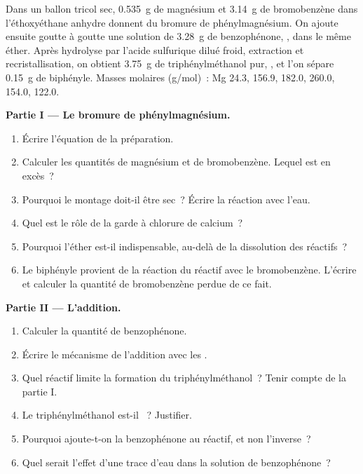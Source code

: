 \begin{problem}
\label{pb:b1:organomagnesium:1}
Dans un ballon tricol sec, \qty{0.535}{g} de magnésium et
\qty{3.14}{g} de bromobenzène dans l'éthoxyéthane anhydre donnent du
bromure de phénylmagnésium. On ajoute ensuite goutte à goutte une
solution de \qty{3.28}{g} de benzophénone,
, dans le même éther. Après hydrolyse par l'acide
sulfurique dilué froid, extraction et recristallisation, on obtient
\qty{3.75}{g} de triphénylméthanol pur, , et l'on sépare
\qty{0.15}{g} de biphényle. Masses molaires (\unit{g/mol})~:
Mg 24.3,  156.9,  182.0,  260.0,
 154.0,  122.0.

\medskip
\noindent\textbf{Partie I --- Le bromure de phénylmagnésium.}
\begin{enumerate}
  \item Écrire l'équation de la préparation.
  \item Calculer les quantités de magnésium et de bromobenzène. Lequel
        est en excès~?
  \item Pourquoi le montage doit-il être sec~? Écrire la réaction avec
        l'eau.
  \item Quel est le rôle de la garde à chlorure de calcium~?
  \item Pourquoi l'éther est-il indispensable, au-delà de la
        dissolution des réactifs~?
  \item Le biphényle provient de la réaction du réactif avec le
        bromobenzène. L'écrire et calculer la quantité de bromobenzène
        perdue de ce fait.
\end{enumerate}

\medskip
\noindent\textbf{Partie II --- L'addition.}
\begin{enumerate}[resume]
  \item Calculer la quantité de benzophénone.
  \item Écrire le mécanisme de l'addition avec les .
  \item Quel réactif limite la formation du triphénylméthanol~? Tenir
        compte de la partie I.
  \item Le triphénylméthanol est-il ~? Justifier.
  \item Pourquoi ajoute-t-on la benzophénone au réactif, et non
        l'inverse~?
  \item Quel serait l'effet d'une trace d'eau dans la solution de
        benzophénone~?
\end{enumerate}


\end{problem}
